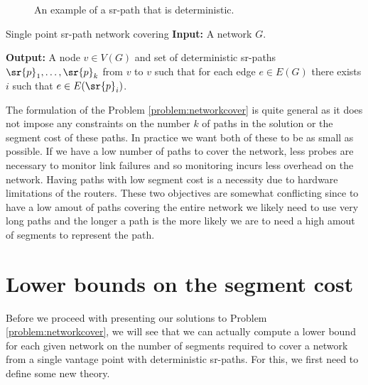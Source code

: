 \begin{figure}[H]
\begin{center}
\end{center}
\label{fig:ecmp-free}
\caption{An example of a sr-path that is deterministic.}
\end{figure}

\begin{problem}{Single point sr-path network covering}
\label{problem:networkcover}
\textbf{Input:} A network $G$.

\textbf{Output:} A node $v \in V(G)$ and set of deterministic sr-paths $\sr{p}_1, \ldots, \sr{p}_k$ from $v$ to $v$
such that for each edge $e \in E(G)$ there exists $i$ such that $e \in E(\sr{p}_i)$.
\end{problem}

The formulation of the Problem \ref{problem:networkcover} is quite general as it does not impose any constraints on the
number $k$ of paths in the solution or the segment cost of these paths. In practice we want both of these to be as small as possible.
If we have a low number of paths to cover the network, less probes are necessary to monitor link failures and so monitoring
incurs less overhead on the network. Having paths with low segment cost is a necessity due to hardware limitations of the routers. 
These two objectives are somewhat conflicting since to have a low amout of paths covering the entire network we likely need to use
very long paths and the longer a path is the more likely we are to need a high amout of segments to represent the path.


\section{Lower bounds on the segment cost}

Before we proceed with presenting our solutions to Problem \ref{problem:networkcover}, we will see that we can actually compute
a lower bound for each given network on the number of segments required to cover a network from a single vantage point with deterministic
sr-paths. For this, we first need to define some new theory.

